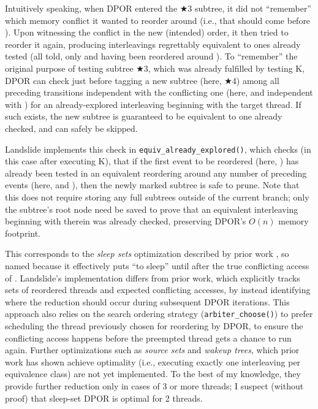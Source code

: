 Intuitively speaking,
when DPOR entered the $\bigstar$3 subtree,
it did not ``remember'' which memory conflict it wanted to reorder  around
(i.e., that  should come before ).
Upon witnessing the conflict in the new (intended) order,
it then tried to reorder it again,
producing interleavings regrettably equivalent to ones already tested
(all told, only  and  having been reordered around ).
%
To ``remember'' the original purpose of testing subtree $\bigstar$3,
which was already fulfilled by testing K,
DPOR can check just before tagging a new subtree (here, $\bigstar$4)
among all preceding transitions independent with the conflicting one
(here,  and  independent with )
for an already-explored interleaving beginning with the target thread.
If such exists,
the new subtree is guaranteed to be equivalent to one already checked,
and can safely be skipped.

Landslide implements this check in {\tt equiv\_already\_explored()},
which checks (in this case after executing K),
that if the first event to be reordered (here, )
has already been tested in an equivalent reordering around any number of preceding events
(here,  and ),
then the newly marked subtree is safe to prune.
Note that this does not require storing any full subtrees outside of the current branch;
only the subtree's root node need be saved to
prove that an equivalent interleaving beginning with  therein was already checked,
preserving DPOR's $O(n)$ memory footprint.

This corresponds to the {\em sleep sets} optimization described by prior work \cite{partial-order-methods,dpor,optimal-dpor},
so named because it effectively puts 
``to sleep'' until after the true conflicting access of .
Landslide's implementation differs from prior work,
which explicitly tracks sets of reordered threads and expected conflicting accesses,
by instead identifying
where the reduction should occur
during subsequent DPOR iterations.
This approach also relies on the search ordering strategy ({\tt arbiter\_choose()})
to prefer scheduling the thread previously chosen for reordering by DPOR,
to ensure the conflicting access happens before the preempted thread gets a chance to run again.
Further optimizations such as {\em source sets} and {\em wakeup trees},
which prior work has shown achieve optimality
(i.e., executing exactly one interleaving per equivalence class) \cite{optimal-dpor}
are not yet implemented.
To the best of my knowledge,
they provide further reduction only in cases of 3 or more threads;
I suspect (without proof) that sleep-set DPOR is optimal for 2 threads.

